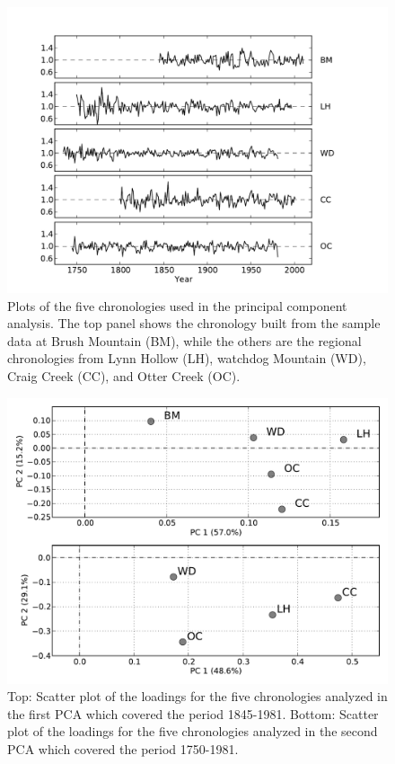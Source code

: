 \begin{figure}
\centering
\includegraphics[width=5in]{figures/stacked_chrons.pdf}
\caption{Plots of the five chronologies used in the principal component analysis. The top panel shows the chronology built from the sample data at Brush Mountain (BM), while the others are the regional chronologies from Lynn Hollow (LH), watchdog Mountain (WD), Craig Creek (CC), and Otter Creek (OC).}
\label{fig:stackedChrons}
\end{figure}

\begin{figure}
\centering
\includegraphics[width=5in]{figures/scoresPlot.pdf}
\caption{Top: Scatter plot of the loadings for the five chronologies analyzed in the first PCA which covered the period 1845-1981. Bottom: Scatter plot of the loadings for the five chronologies analyzed in the second PCA which covered the period 1750-1981.}
\label{fig:scores}
\end{figure}

